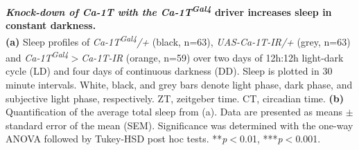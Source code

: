 \label{fig:S4}
\textbf{\emph{Knock-down of Ca-\alpha1T with the \emph{Ca-\alpha1T\textsuperscript{Gal4}}} driver increases sleep in constant darkness.}
\\
\textbf{(a)} Sleep profiles of \emph{Ca-\alpha1T\textsuperscript{Gal4}/+} (black, n=63), \emph{UAS-Ca-\alpha1T-IR/+} (grey, n=63) and \emph{Ca-\alpha1T\textsuperscript{Gal4}$>$Ca-\alpha1T-IR} (orange, n=59) over two days of 12h:12h light-dark cycle (LD) and four days of continuous darkness (DD).
Sleep is plotted in 30 minute intervals.
White, black, and grey bars denote light phase, dark phase, and subjective light phase, respectively.
ZT, zeitgeber time.
CT, circadian time.
\textbf{(b)} Quantification of the average total sleep from (a).
Data are presented as means $\pm$ standard error of the mean (SEM).
Significance was determined with the one-way ANOVA followed by Tukey-HSD post hoc tests.
**\emph{p}$<$0.01, ***\emph{p}$<$0.001.
